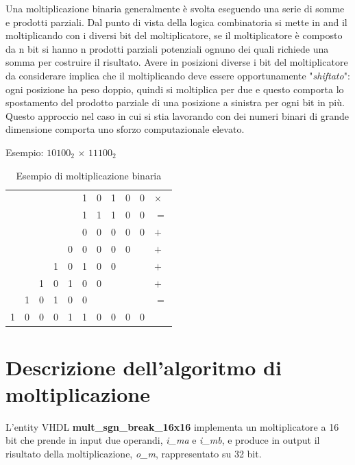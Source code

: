 \documentclass[titlepage]{report}
\begin{document}
		Una moltiplicazione binaria generalmente è svolta eseguendo una serie di somme e prodotti parziali. Dal punto di vista della logica combinatoria si mette in and il moltiplicando con i diversi bit del moltiplicatore, se il moltiplicatore è composto da n bit si hanno n prodotti parziali potenziali ognuno dei quali richiede una somma per costruire il risultato. Avere in posizioni diverse i bit del moltiplicatore da considerare implica che il moltiplicando deve essere opportunamente "\textit{shiftato}": ogni posizione ha peso doppio, quindi si moltiplica per due e questo comporta lo spostamento del prodotto parziale di una posizione a sinistra per ogni bit in più.
		Questo approccio nel caso in cui si stia lavorando con dei numeri binari di grande dimensione
		comporta uno sforzo computazionale elevato.
		
		Esempio: $10100_2\,\times\,11100_2$

		\begin{table}[h!]
			\centering
			\begin{tabular}{*{11}{p{0.5cm}}}
					&  &  &  &  & 1 & 0 & 1 & 0 & 0 & $\times$  \\
					&  &  &  &  & 1 & 1 & 1 & 0 & 0 & $=$ \\
				\cline{1-11}
				& & & &  & 0 & 0 & 0 & 0 & 0 & $+$ \\
				& & & & 0 & 0 & 0 & 0 & 0 &  & $+$ \\
				& &  & 1 & 0 & 1 & 0 & 0 &  &  & $+$ \\
				& & 1 & 0 & 1 & 0 & 0 &   &  &  & $+$ \\
			 	& 1 & 0 & 1 & 0 & 0 &   &   &  &  & $=$ \\
				\cline{1-11}
				 1 & 0 & 0 & 0 & 1 & 1 & 0 & 0 & 0 & 0 & \\
			\end{tabular}
			\caption{Esempio di moltiplicazione binaria}
			\label{tab:es_mult_bin}
		\end{table}
	\section*{Descrizione dell'algoritmo di moltiplicazione}
	\label{sec:algoritmo_moltiplicazione}
		L'entity VHDL \textbf{mult\_sgn\_break\_16x16} implementa un moltiplicatore a 16 bit che prende in input due operandi, \textit{i\_ma} e \textit{i\_mb}, e produce in output il risultato della moltiplicazione, \textit{o\_m}, rappresentato su 32 bit.
\end{document}
